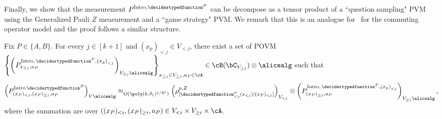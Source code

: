 Finally, we show that the measurement $P^{\text{Intro}, \decidertypedfunction^P}$ can be decompose as a tensor product of a ``question sampling" PVM using the Generalized Pauli $Z$ measurement and a ``game strategy" PVM. We remark that this is an analogue for~\cite[Lemma 8.24]{jiMIPRE2022a} for the commuting operator model and the proof follows a similar structure. 
\begin{claim} \label{claim:QRconstructingstrategy}
	Fix $P \in \{A,B\}$. For every $j \in [k+1]$ and $\left(x_p\right)_{< j} \in V_{< j}$, there exist a set of POVM $\left\{\left(P^{\text{Intro}, \, \decidertypedfunction^P, \left(x_p\right)_{< j}}_{x_{\geq j}, a_P} \right)_{V_{\geq j} \alicealg} \right\}_{ x_{\geq j} \in V_{\geq j}, a_P \in \cA} \in \cB(\bC_{V_{\geq j}}) \otimes \alicealg$ such that 
	\begin{equation*}
		\left(P^{\text{Intro} \, \decidertypedfunction^P}_{(x_P)_{< j}, (x_P)_{\geq j}, a_P} \right)_{V \alicealg}	\approx_{O(\poly(k, \delta_1)^{1/2^j})} \left(\rho^{p,Z}_{[\decidertypedfunction^P_{< j}(s_{< j})|(x_P)_{< j} ]}\right)_{V_{< j}} \otimes \left(P^{\text{Intro}, \, \decidertypedfunction^P, \left(x_p\right)_{< j}}_{(x_P)_{\geq j}, a_P} \right)_{V_{\geq j} \alicealg}, 
	\end{equation*}
	where the summation are over $((x_P)_{< i}, (x_P)_{\geq i}, a_P) \in V_{< i} \times V_{\geq i} \times \cA$.
\end{claim}

